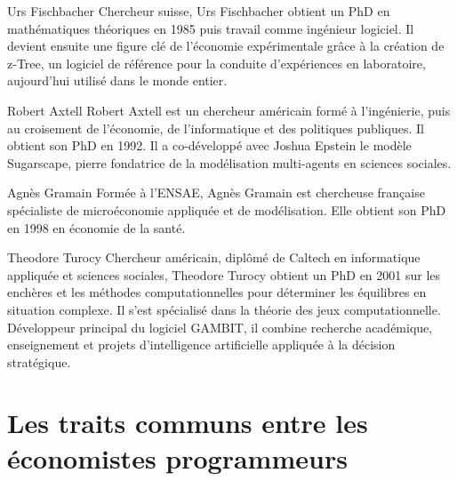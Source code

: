 Urs Fischbacher
Chercheur suisse, Urs Fischbacher obtient un PhD en mathématiques théoriques en 1985 puis travail comme ingénieur logiciel. Il devient ensuite une figure clé de l’économie expérimentale grâce à la création de z-Tree, un logiciel de référence pour la conduite d’expériences en laboratoire, aujourd’hui utilisé dans le monde entier.

Robert Axtell
Robert Axtell est un chercheur américain formé à l’ingénierie, puis au croisement de l’économie, de l’informatique et des politiques publiques. Il obtient son PhD en 1992. Il a co-développé avec Joshua Epstein le modèle Sugarscape, pierre fondatrice de la modélisation multi-agents en sciences sociales.

Agnès Gramain
Formée à l’ENSAE, Agnès Gramain est chercheuse française spécialiste de microéconomie appliquée et de modélisation. Elle obtient son PhD en 1998 en économie de la santé. 

Theodore Turocy
Chercheur américain, diplômé de Caltech en informatique appliquée et sciences sociales, Theodore Turocy obtient un PhD en 2001 sur les enchères et les méthodes computationnelles pour déterminer les équilibres en situation complexe. Il s’est spécialisé dans la théorie des jeux computationnelle. Développeur principal du logiciel GAMBIT, il combine recherche académique, enseignement et projets d’intelligence artificielle appliquée à la décision stratégique.


\section{Les traits communs entre les économistes programmeurs}

